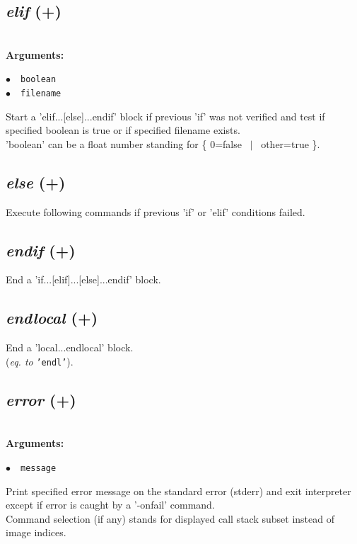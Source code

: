 \documentclass[a4paper,10.5pt,twoside]{book}
\def\comma{\discretionary{,}{}{,}}
\newcommand{\Cb}[1]{\textcolor{cb}{#1}}
\begin{document}
\subsection{\emph{elif} (+)}\vspace*{-0.7em}
~\\\textbf{\Cb{Arguments: }}\begin{flushleft}
{\small \Cb{\hspace*{0.5cm}$\bullet$~~\texttt{boolean}}}~~~\\
{\small \Cb{\hspace*{0.5cm}$\bullet$~~\texttt{filename}}}\end{flushleft}
Start a 'elif...[else]...endif' block if previous 'if' was not verified
and test if specified boolean is true{\comma} or if specified filename exists.
~\\'boolean' can be a float number standing for \{ 0=false ~$|$~ other=true \}.


\subsection{\emph{else} (+)}\vspace*{-0.7em}
Execute following commands if previous 'if' or 'elif' conditions failed.


\subsection{\emph{endif} (+)}\vspace*{-0.7em}
End a 'if...[elif]...[else]...endif' block.


\subsection{\emph{endlocal} (+)}\vspace*{-0.7em}
End a 'local...endlocal' block.
~\\(\emph{eq. to} {\small \texttt{'endl'}}).


\subsection{\emph{error} (+)}\vspace*{-0.7em}
~\\\textbf{\Cb{Arguments: }}\begin{flushleft}
{\small \Cb{\hspace*{0.5cm}$\bullet$~~\texttt{message}}}\end{flushleft}
Print specified error message on the standard error (stderr) and exit interpreter{\comma} except
if error is caught by a '-onfail' command.
~\\Command selection (if any) stands for displayed call stack subset instead of image indices.
\end{document}
